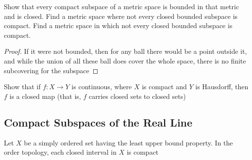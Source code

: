 \documentclass[11pt]{article}
\begin{document}
\begin{exercise}
\label{ex26.4}
Show that every compact subspace of a metric space is bounded in that metric and is closed. Find
a metric space where not every closed bounded subspace is compact. Find a metric space in which
not every closed bounded subspace is compact.
\end{exercise}

\begin{proof}
If it were not bounded, then for any ball there would be a point outside it, and while the union
of all these ball does cover the whole space, there is no finite subcovering for the subspace
\end{proof}

\begin{exercise}
Show that if \(f:X\to Y\) is continuous, where \(X\) is compact and \(Y\) is Hausdorff, then \(f\)
is a closed map (that is, \(f\) carries closed sets to closed sets)
\end{exercise}

\subsection{Compact Subspaces of the Real Line}
\label{sec:org508aeb4}
\begin{theorem}[]
Let \(X\) be a simply ordered set having the least upper bound property. In the order topology,
each closed interval in \(X\) is compact
\end{theorem}
\end{document}
